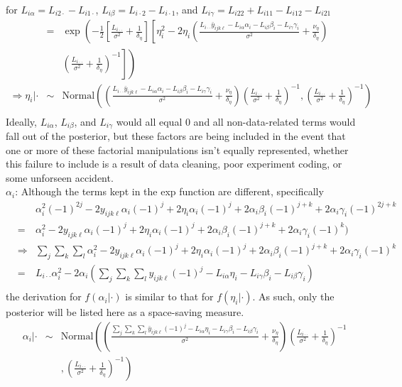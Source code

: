 for $L_{i\alpha}=L_{i2\cdot}-L_{i1\cdot}$, $L_{i\beta}=L_{i\cdot 2}-L_{i\cdot 1}$, and $L_{i\gamma}=L_{i22}+L_{i11}-L_{i12}-L_{i21}$\\
\begin{eqnarray*}
&=&\exp\left(-\frac{1}{2}\left[\frac{L_{i\cdot\cdot}}{\sigma^2}+\frac{1}{\delta_{\eta}}\right]\left[\eta_i^2-2\eta_i\left(\frac{L_{i\cdot\cdot}\bar{y}_{ijk\ell}-L_{i\alpha}\alpha_i-L_{i\beta}\beta_i-L_{i\gamma}\gamma_i}{\sigma^2}+\frac{\nu_{\eta}}{\delta_{\eta}}\right)\right.\right.\\
&&\left.\left.\left(\frac{L_{i\cdot\cdot}}{\sigma^2}+\frac{1}{\delta_{\eta}}\right)^{-1}\right]\right)\\
\Rightarrow \eta_i|\cdot &\sim& \mbox{Normal}\left(\left(\frac{L_{i\cdot\cdot}\bar{y}_{ijk\ell}-L_{i\alpha}\alpha_i-L_{i\beta}\beta_i-L_{i\gamma}\gamma_i}{\sigma^2}+\frac{\nu_{\eta}}{\delta_{\eta}}\right)\left(\frac{L_{i\cdot\cdot}}{\sigma^2}+\frac{1}{\delta_{\eta}}\right)^{-1},\left(\frac{L_{i\cdot\cdot}}{\sigma^2}+\frac{1}{\delta_{\eta}}\right)^{-1}\right)\\
\end{eqnarray*}
Ideally, $L_{i\alpha}$, $L_{i\beta}$, and $L_{i\gamma}$ would all
equal 0 and all non-data-related terms would fall out of the
posterior, but these factors are being included in the event that one
or more of these factorial manipulations isn't equally represented,
whether this failure to include is a result of data cleaning, poor
experiment coding, or some unforseen accident.\\

$\alpha_{i}$:
Although the terms kept in the exp function are different, specifically
\begin{eqnarray*}
&&\alpha_i^2(-1)^{2j}-2y_{ijk\ell}\alpha_i(-1)^j+2\eta_i\alpha_i(-1)^j+2\alpha_i\beta_i(-1)^{j+k}+2\alpha_i\gamma_i(-1)^{2j+k}\\ 
&=& \alpha_i^2-2y_{ijk\ell}\alpha_i(-1)^j+2\eta_i\alpha_i(-1)^j+2\alpha_i\beta_i(-1)^{j+k}+2\alpha_i\gamma_i(-1)^k)\\
&\Rightarrow&\sum_j\sum_k\sum_l\alpha_i^2-2y_{ijk\ell}\alpha_i(-1)^j+2\eta_i\alpha_i(-1)^j+2\alpha_i\beta_i(-1)^{j+k}+2\alpha_i\gamma_i(-1)^{k}\\
&=&L_{i\cdot\cdot}\alpha_i^2-2\alpha_i\left(\sum_j\sum_k\sum_ly_{ijk\ell}(-1)^j-L_{i\alpha}\eta_i-L_{i\gamma}\beta_i-L_{i\beta}\gamma_i\right)\\
\end{eqnarray*}
the derivation for $f(\alpha_i|\cdot)$ is similar to that for
$f(\eta_i|\cdot)$.  As such, only the posterior will be listed here as
a space-saving measure.
\begin{eqnarray*}
\alpha_i|\cdot&\sim&\mbox{Normal}\left(\left(\frac{\sum_j\sum_k\sum_l\bar{y}_{ijk\ell}(-1)^j-L_{i\alpha}\eta_i-L_{i\gamma}\beta_i-L_{i\beta}\gamma_i}{\sigma^2}+\frac{\nu_{\eta}}{\delta_{\eta}}\right)\left(\frac{L_{i\cdot\cdot}}{\sigma^2}+\frac{1}{\delta_{\eta}}\right)^{-1}\right.\\
&&\left.,\left(\frac{L_{i\cdot\cdot}}{\sigma^2}+\frac{1}{\delta_{\eta}}\right)^{-1}\right)\\
\end{eqnarray*}

